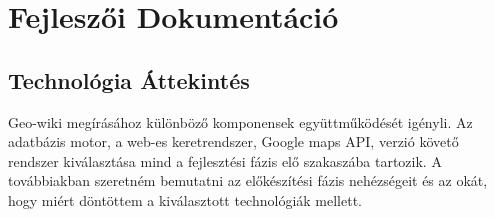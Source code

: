 \makeatletter
\def\thickhrulefill{\leavevmode \leaders \hrule height 1ex \hfill \kern \z@}
\def\@makechapterhead#1{%
  \vspace*{10\p@}%
  {\parindent \z@ \centering \reset@font
        {\Huge \scshape \thechapter}
        \par\nobreak
        \vspace*{15\p@}%
        \interlinepenalty\@M
        \begin{tabular}{@{\qquad}c@{\qquad}}
          \hline
          \\
          {\Huge \bfseries #1\par\nobreak} \\
          \\
          \hline
        \end{tabular}
    \vskip 100\p@
  }}
\def\@makeschapterhead#1{%
  \vspace*{10\p@}%
  {\parindent \z@ \centering \reset@font
        {\Huge \scshape \vphantom{\thechapter}}
        \par\nobreak
        \vspace*{15\p@}%
        \interlinepenalty\@M
        \begin{tabular}{@{\qquad}c@{\qquad}}
          \hline
          \\
          {\Huge \bfseries #1\par\nobreak} \\
          \\
          \hline
        \end{tabular}
    \vskip 100\p@
  }}

\chapter{Fejleszői Dokumentáció}
	\section{Technológia Áttekintés}
	Geo-wiki megírásához különböző komponensek együttműködését igényli. Az adatbázis motor, a web-es keretrendszer, Google maps API, verzió követő rendszer kiválasztása mind
	a fejlesztési fázis elő szakaszába tartozik. A továbbiakban szeretném bemutatni az előkészítési fázis nehézségeit és az okát, hogy miért döntöttem
	a kiválasztott technológiák mellett.
	
